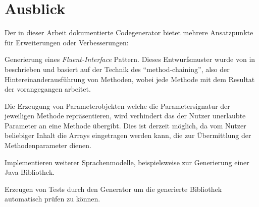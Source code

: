 \section{Ausblick}
\label{sec:prospect}


Der in dieser Arbeit dokumentierte Codegenerator bietet mehrere Ansatzpunkte für Erweiterungen oder Verbesserungen:


\begin{compactitem}
    \item Generierung eines \emph{Fluent-Interface} Pattern. Dieses Entwurfsmuster wurde von \citeauthor{fowler2010domain} in \cite{fowler2010domain} beschrieben und basiert auf der Technik des \enquote{method-chaining}, also der Hintereinanderausführung von Methoden, wobei jede Methode mit dem Resultat der vorangegangen arbeitet.
    \item Die Erzeugung von Parameterobjekten welche die Parametersignatur der jeweiligen Methode repräsentieren, wird verhindert das der Nutzer unerlaubte Parameter an eine Methode übergibt. Dies ist derzeit möglich, da vom Nutzer beliebiger Inhalt die Arrays eingetragen werden kann, die zur Übermittlung der Methodenparameter dienen.
    \item Implementieren weiterer Sprachenmodelle, beispielsweise zur Generierung einer Java-Bibliothek. 
    \item Erzeugen von Tests durch den Generator um die generierte Bibliothek automatisch prüfen zu können.
\end{compactitem}